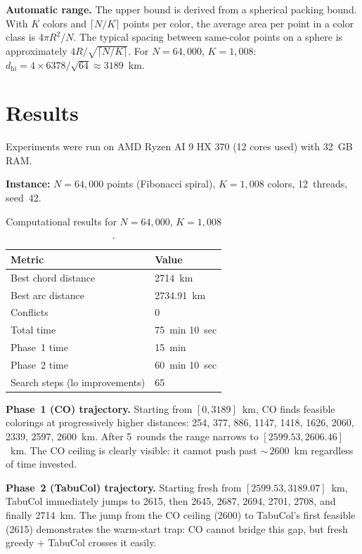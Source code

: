 \documentclass[11pt,a4paper]{article}
\begin{document}
\textbf{Automatic range.} The upper bound is derived from a spherical packing bound. With
$K$ colors and $\lceil N/K \rceil$ points per color, the average area per point in a color
class is $4\pi R^2 / N$. The typical spacing between same-color points on a sphere is
approximately $4R / \sqrt{\lceil N/K \rceil}$. For $N = 64{,}000$, $K = 1{,}008$:
$d_{\text{hi}} = 4 \times 6378 / \sqrt{64} \approx 3189$~km.


\section{Results}

Experiments were run on AMD Ryzen AI 9 HX 370 (12 cores used) with 32~GB RAM.

\textbf{Instance:} $N = 64{,}000$ points (Fibonacci spiral), $K = 1{,}008$ colors,
12~threads, seed~42.

\begin{table}[ht]
\centering
\caption{Computational results for $N = 64{,}000$, $K = 1{,}008$.}
\begin{tabular}{@{}ll@{}}
\toprule
Metric & Value \\
\midrule
Best chord distance & 2714~km \\
Best arc distance & 2734.91~km \\
Conflicts & 0 \\
Total time & 75~min 10~sec \\
Phase~1 time & 15~min \\
Phase~2 time & 60~min 10~sec \\
Search steps (lo improvements) & 65 \\
\bottomrule
\end{tabular}
\end{table}

\textbf{Phase~1 (CO) trajectory.} Starting from $[0, 3189]$~km, CO finds feasible
colorings at progressively higher distances: 254, 377, 886, 1147, 1418, 1626, 2060, 2339,
2597, 2600~km. After 5~rounds the range narrows to $[2599.53, 2606.46]$~km. The CO
ceiling is clearly visible: it cannot push past ${\sim}\, 2600$~km regardless of time
invested.

\textbf{Phase~2 (TabuCol) trajectory.} Starting fresh from $[2599.53, 3189.07]$~km,
TabuCol immediately jumps to 2615, then 2645, 2687, 2694, 2701, 2708, and finally
2714~km. The jump from the CO ceiling (2600) to TabuCol's first feasible (2615)
demonstrates the warm-start trap: CO cannot bridge this gap, but fresh greedy + TabuCol
crosses it easily.
\end{document}
